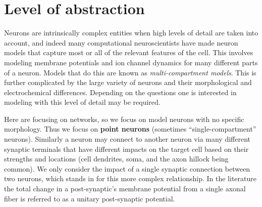 \section{Level of abstraction}

Neurons are intrinsically complex entities when high levels of detail are taken into account, and indeed many computational neuroscientists have made neuron models that capture most or all of the relevant features of the cell. This involves modeling membrane potentials and ion channel dynamics for many different parts of a neuron. Models that do this are known as \emph{multi-compartment models}. This is further complicated by the large variety of neurons and their morphological and electrochemical differences. Depending on the questions one is interested in modeling with this level of detail may be required. 

Here are focusing on networks, so we focus on model neurons with no specific morphology. Thus we focus on \textbf{point neurons} (sometimes ``single-compartment'' neurons). Similarly a neuron may connect to another neuron via many different synaptic terminals that have different impacts on the target cell based on their strengths and locations (cell dendrites, soma, and the axon hillock being common). We only consider the impact of a single synaptic connection between two neurons, which stands in for this more complex relationship. In the literature the total change in a post-synaptic's membrane potential from a single axonal fiber is referred to as a unitary post-synaptic potential. 
	
